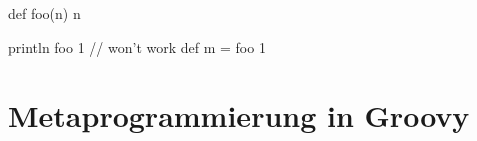 \documentclass[11pt,english,ngerman, headsepline]{scrreprt}
\begin{document}
def foo(n) { n }

println foo 1 // won't work
def m = foo 1

\section{Metaprogrammierung in Groovy}

% 
% 
% 
% 
% 
\end{document}

